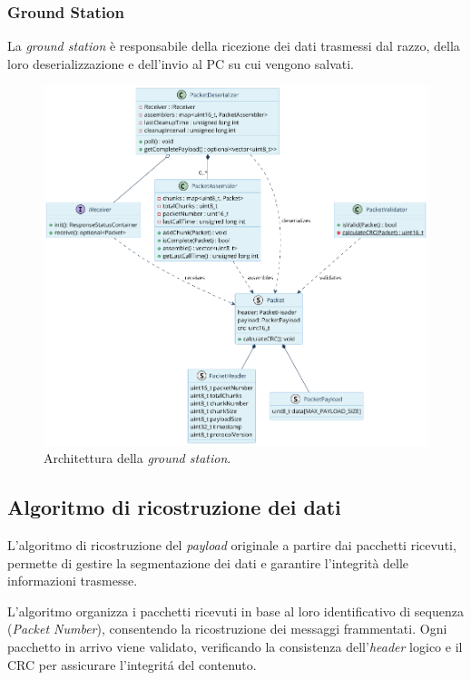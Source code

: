 \documentclass[12pt,a4paper,twoside]{book}
\begin{document}
\subsubsection{Ground Station}
La \emph{ground station} è responsabile della ricezione dei dati trasmessi dal
razzo, della loro deserializzazione e dell'invio al PC su cui vengono salvati.
\begin{figure}[H]
    \centering
    \includegraphics[width=\textwidth]{img/uml/ground-station.png}
    \caption{Architettura della \emph{ground station}.}
    \label{fig:ground-station-architecture}
\end{figure}
\newpage
\subsection{Algoritmo di ricostruzione dei dati} 
L'algoritmo di ricostruzione del \emph{payload} originale a partire dai pacchetti
ricevuti, permette di gestire la segmentazione dei dati e garantire l'integrità
delle informazioni trasmesse.

L'algoritmo organizza i pacchetti ricevuti in base al loro identificativo di sequenza
(\emph{Packet Number}), consentendo la ricostruzione dei messaggi frammentati.
Ogni pacchetto in arrivo viene validato, verificando la consistenza dell'\emph{header} logico
e il \ac{CRC} per assicurare l'integrit\'a del contenuto.
\end{document}
